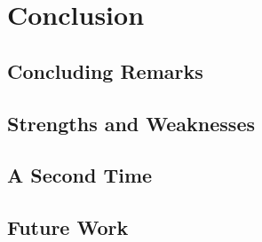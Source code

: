 \section{Conclusion}
\subsection{Concluding Remarks}


\subsection{Strengths and Weaknesses}

\subsection{A Second Time}


\subsection{Future Work}
